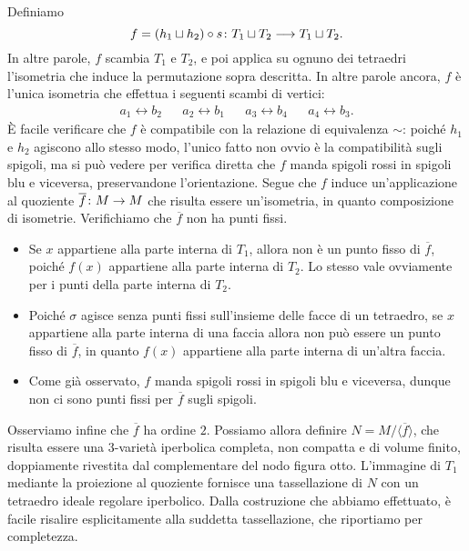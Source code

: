 Definiamo
\[
\map{f=(h_1\sqcup h_2)\circ s}{T_1\sqcup T_2}{T_1\sqcup T_2.}
\]
In altre parole, $f$ scambia $T_1$ e $T_2$, e poi applica su ognuno dei tetraedri l'isometria che induce la permutazione sopra descritta. In altre parole ancora, $f$ è l'unica isometria che effettua i seguenti scambi di vertici:
\begin{align*}
a_1\leftrightarrow b_2&&a_2\leftrightarrow b_1&&a_3\leftrightarrow b_4&&a_4\leftrightarrow b_3.
\end{align*}
È facile verificare che $f$ è compatibile con la relazione di equivalenza $\sim$: poiché $h_1$ e $h_2$ agiscono allo stesso modo, l'unico fatto non ovvio è la compatibilità sugli spigoli, ma si può vedere per verifica diretta che $f$ manda spigoli rossi in spigoli blu e viceversa, preservandone l'orientazione.
Segue che $f$ induce un'applicazione al quoziente $\map{\overline{f}}{M}{M}$ che risulta essere un'isometria, in quanto composizione di isometrie. Verifichiamo che $\overline{f}$ non ha punti fissi.
\begin{itemize}
\item Se $x$ appartiene alla parte interna di $T_1$, allora non è un punto fisso di $\overline{f}$, poiché $f(x)$ appartiene alla parte interna di $T_2$. Lo stesso vale ovviamente per i punti della parte interna di $T_2$.
\item Poiché $\sigma$ agisce senza punti fissi sull'insieme delle facce di un tetraedro, se $x$ appartiene alla parte interna di una faccia allora non può essere un punto fisso di $\overline{f}$, in quanto $f(x)$ appartiene alla parte interna di un'altra faccia.
\item Come già osservato, $f$ manda spigoli rossi in spigoli blu e viceversa, dunque non ci sono punti fissi per $\overline{f}$ sugli spigoli.
\end{itemize}
Osserviamo infine che $\overline{f}$ ha ordine $2$. Possiamo allora definire $N=M/\langle\overline{f}\rangle$, che risulta essere una $3$-varietà iperbolica completa, non compatta e di volume finito, doppiamente rivestita dal complementare del nodo figura otto. L'immagine di $T_1$ mediante la proiezione al quoziente fornisce una tassellazione di $N$ con un tetraedro ideale regolare iperbolico. Dalla costruzione che abbiamo effettuato, è facile risalire esplicitamente alla suddetta tassellazione, che riportiamo per completezza.

